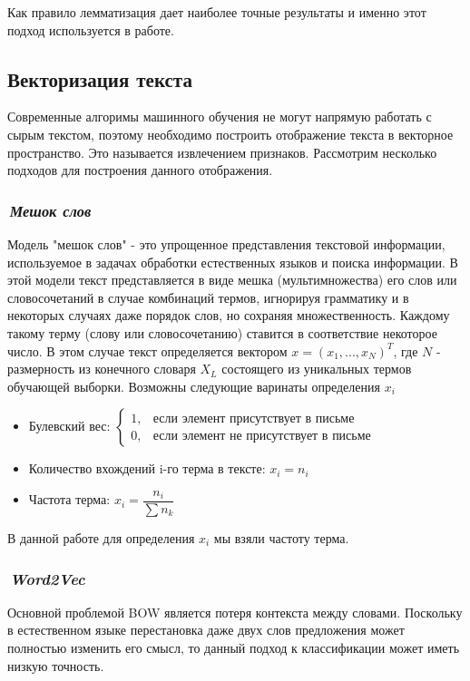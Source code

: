 \documentclass[12pt]{article}
\begin{document}
Как правило лемматизация дает наиболее точные результаты и именно этот подход используется в работе.

\subsection{Векторизация текста}
Современные алгоримы машинного обучения не могут напрямую работать с сырым текстом, поэтому необходимо построить отображение текста в векторное пространство. Это называется извлечением признаков. Рассмотрим несколько подходов для построения данного отображения.

\subsubsection*{\it\,Мешок слов}
Модель "мешок слов" - это упрощенное представления текстовой информации, используемое в задачах обработки естественных языков и поиска информации. В этой модели текст представляется в виде мешка (мультимножества) его слов или словосочетаний в случае комбинаций термов, игнорируя грамматику и в некоторых случаях даже порядок слов, но сохраняя множественность. Каждому такому терму (слову или словосочетанию) ставится в соответствие некоторое число. В этом случае текст определяется вектором $x=(x_1, ..., x_N)^T$, где $N$ - размерность из конечного словаря $X_L$ состоящего из уникальных термов обучающей выборки. Возможны следующие варинаты определения $x_i$
\begin{itemize}
\item Булевский вес: $\begin{cases} 1, & \mbox{если элемент присутствует в письме} \\ 0, & \mbox{если элемент не присутствует в письме}  \end{cases}$
\item Количество вхождений i-го терма в тексте: $x_i = n_i$
\item Частота терма: $x_i = \dfrac{n_i}{\sum n_k}$
\end{itemize}

В данной работе для определения $x_i$ мы взяли частоту терма.

\subsubsection*{\it\,Word2Vec}

Основной проблемой BOW является потеря контекста между словами. Поскольку в естественном языке перестановка даже двух слов предложения  может полностью изменить его смысл, то данный подход к классификации может иметь низкую точность.
\end{document}
